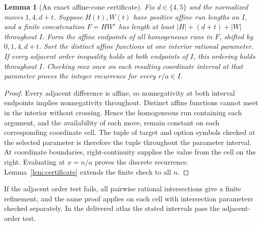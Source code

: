 \documentclass[11pt]{article}
\newtheorem{lemma}[theorem]{Lemma}
\theoremstyle{remark}\newtheorem{remark}[theorem]{Remark}
\begin{document}
\begin{lemma}[An exact affine-cone certificate]\label{lem:atlas}
Fix $d\in\{4,5\}$ and the normalized moves $1,4,d+t$. Suppose $H(t),W(t)$ have positive affine run lengths on $I$, and a finite concatenation $F=HW^e$ has length at least $|H|+(d+t)+|W|$ throughout $I$. Form the affine endpoints of all homogeneous runs in $F$, shifted by $0,1,4,d+t$. Sort the distinct affine functions at one interior rational parameter. If every adjacent order inequality holds at both endpoints of $I$, this ordering holds throughout $I$. Checking mex once on each resulting coordinate interval at that parameter proves the integer recurrence for every $r/a\in I$.
\end{lemma}
\begin{proof}
Every adjacent difference is affine, so nonnegativity at both interval endpoints implies nonnegativity throughout. Distinct affine functions cannot meet in the interior without crossing. Hence the homogeneous run containing each argument, and the availability of each move, remain constant on each corresponding coordinate cell. The tuple of target and option symbols checked at the selected parameter is therefore the tuple throughout the parameter interval. At coordinate boundaries, right-continuity supplies the value from the cell on the right. Evaluating at $x=n/a$ proves the discrete recurrence. Lemma~\ref{lem:certificate} extends the finite check to all $n$.
\end{proof}
If the adjacent order test fails, all pairwise rational intersections give a finite refinement, and the same proof applies on each cell with intersection parameters checked separately. In the delivered atlas the stated intervals pass the adjacent-order test.
\end{document}
